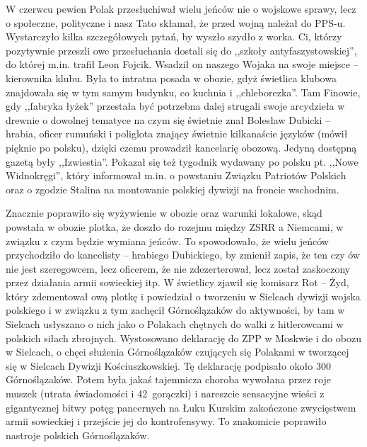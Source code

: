 W czerwcu pewien Polak przesłuchiwał wielu jeńców nie o wojskowe sprawy, lecz o społeczne, polityczne i nasz Tato skłamał, że przed wojną należał do PPS-u. Wystarczyło kilka szczegółowych pytań, by wyszło szydło z worka. Ci, którzy pozytywnie przeszli owe przesłuchania dostali się do ,,szkoły antyfaszystowskiej'', do której m.in. trafił Leon Fojcik. Wsadził on naszego Wojaka na swoje miejsce -- kierownika klubu. Była to intratna posada w obozie, gdyż świetlica klubowa znajdowała się w tym samym budynku, co kuchnia i ,,chleborezka''. Tam Finowie, gdy ,,fabryka łyżek'' przestała być potrzebna dalej strugali swoje arcydzieła w drewnie o dowolnej tematyce na czym się świetnie znał Bolesław Dubicki -- hrabia, oficer rumuński i poliglota znający świetnie kilkanaście języków (mówił pięknie po polsku), dzięki czemu prowadził kancelarię obozową. Jedyną dostępną gazetą były ,,Izwiestia''. Pokazał się też tygodnik wydawany po polsku pt. ,,Nowe Widnokręgi'', który informował m.in. o powstaniu Związku Patriotów Polskich oraz o zgodzie Stalina na montowanie polskiej dywizji na froncie wschodnim.

Znacznie poprawiło się wyżywienie w obozie oraz warunki lokalowe, skąd powstała w obozie plotka, że doszło do rozejmu między ZSRR a Niemcami, w związku z czym będzie wymiana jeńców. To spowodowało, że wielu jeńców przychodziło do kancelisty -- hrabiego Dubickiego, by zmienił zapis, że ten czy ów nie jest szeregowcem, lecz oficerem, że nie zdezerterował, lecz został zaskoczony przez działania armii sowieckiej itp. W świetlicy zjawił się komisarz Rot -- Żyd, który zdementował ową plotkę i powiedział o tworzeniu w Sielcach dywizji wojska polskiego i w związku z tym zachęcił Górnoślązaków do aktywności, by tam w Sielcach usłyszano o nich jako o Polakach chętnych do walki z hitlerowcami w polskich siłach zbrojnych. Wystosowano deklarację do ZPP w Moskwie i do obozu w Sielcach, o chęci służenia Górnoślązaków czujących się Polakami w tworzącej się w Sielcach Dywizji Kościuszkowskiej. Tę deklarację podpisało około 300 Górnoślązaków. Potem była jakaś tajemnicza choroba wywołana przez roje muszek (utrata świadomości i 42~\textcelsius gorączki) i nareszcie sensacyjne wieści z gigantycznej bitwy potęg pancernych na Łuku Kurskim zakończone zwycięstwem armii sowieckiej i przejście jej do kontrofensywy. To znakomicie poprawiło nastroje polskich Górnoślązaków. 

